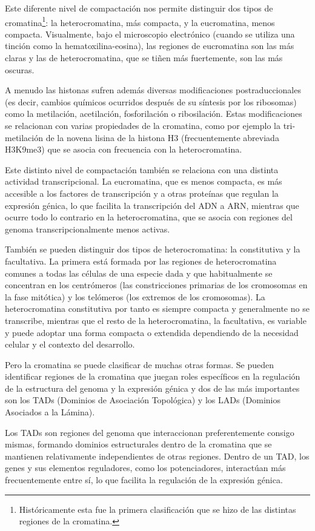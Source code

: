 Este diferente nivel de compactación nos permite distinguir dos tipos de cromatina\footnote{Históricamente esta fue la primera clasificación que se hizo de las distintas regiones de la cromatina.}: la heterocromatina, más compacta, y la eucromatina, menos compacta. Visualmente, bajo el microscopio electrónico (cuando se utiliza una tinción como la hematoxilina-eosina), las regiones de eucromatina son las más claras y las de heterocromatina, que se tiñen más fuertemente, son las más oscuras.

A menudo las histonas sufren además diversas modificaciones postraduccionales (es decir, cambios químicos ocurridos después de su síntesis por los ribosomas) como la metilación, acetilación, fosforilación o ribosilación. Estas modificaciones se relacionan con varias propiedades de la cromatina, como por ejemplo la tri-metilación de la novena lisina de la histona H3 (frecuentemente abreviada H3K9me3) que se asocia con frecuencia con la heterocromatina.

Este distinto nivel de compactación también se relaciona con una distinta actividad transcripcional. La eucromatina, que es menos compacta, es más accesible a los factores de transcripción y a otras proteínas que regulan la expresión génica, lo que facilita la transcripción del ADN a ARN, mientras que ocurre todo lo contrario en la heterocromatina, que se asocia con regiones del genoma transcripcionalmente menos activas.

También se pueden distinguir dos tipos de heterocromatina: la constitutiva y la facultativa. La primera está formada por las regiones de heterocromatina comunes a todas las células de una especie dada y que habitualmente se concentran en los centrómeros (las constricciones primarias de los cromosomas en la fase mitótica) y los telómeros (los extremos de los cromosomas). La heterocromatina constitutiva por tanto es siempre compacta y generalmente no se transcribe, mientras que el resto de la heterocromatina, la facultativa, es variable y puede adoptar una forma compacta o extendida dependiendo de la necesidad celular y el contexto del desarrollo.

Pero la cromatina se puede clasificar de muchas otras formas. Se pueden identificar regiones de la cromatina que juegan roles específicos en la regulación de la estructura del genoma y la expresión génica y dos de las más importantes son los TADs (Dominios de Asociación Topológica) y los LADs (Dominios Asociados a la Lámina).

Los TADs son regiones del genoma que interaccionan preferentemente consigo mismas, formando dominios estructurales dentro de la cromatina que se mantienen relativamente independientes de otras regiones. Dentro de un TAD, los genes y sus elementos reguladores, como los potenciadores, interactúan más frecuentemente entre sí, lo que facilita la regulación de la expresión génica.

